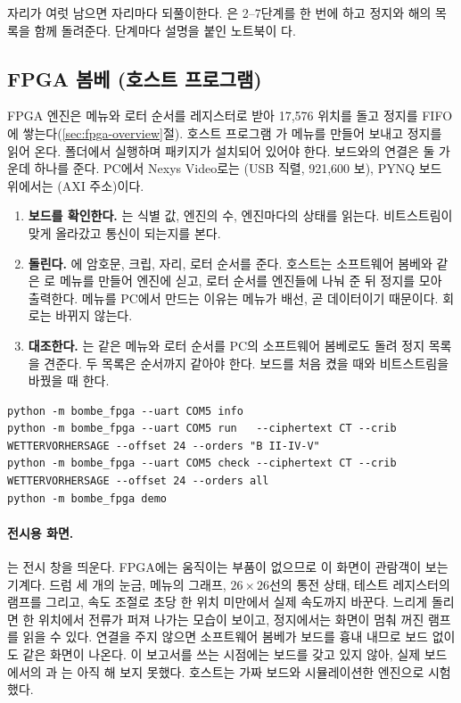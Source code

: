 자리가 여럿 남으면 자리마다 되풀이한다. 은 2--7단계를 한 번에 하고 정지와
해의 목록을 함께 돌려준다. 단계마다 설명을 붙인 노트북이 다.

\subsection{FPGA 봄베 (호스트 프로그램)}

FPGA 엔진은 메뉴와 로터 순서를 레지스터로 받아 17,576 위치를 돌고 정지를 FIFO에 쌓는다(\ref{sec:fpga-overview}절).
호스트 프로그램 가 메뉴를 만들어 보내고 정지를 읽어 온다.  폴더에서
실행하며  패키지가 설치되어 있어야 한다. 보드와의 연결은 둘 가운데 하나를 준다. PC에서 Nexys
Video로는 (USB 직렬, 921,600 보), PYNQ 보드 위에서는 (AXI 주소)이다.

\begin{enumerate}
\item \textbf{보드를 확인한다.} 는 식별 값, 엔진의 수, 엔진마다의 상태를 읽는다. 비트스트림이 맞게
올라갔고 통신이 되는지를 본다.
\item \textbf{돌린다.} 에 암호문, 크립, 자리, 로터 순서를 준다. 호스트는 소프트웨어 봄베와 같은
로 메뉴를 만들어 엔진에 싣고, 로터 순서를 엔진들에 나눠 준 뒤 정지를
모아 출력한다. 메뉴를 PC에서 만드는 이유는 메뉴가 배선, 곧 데이터이기 때문이다. 회로는 바뀌지 않는다.
\item \textbf{대조한다.} 는 같은 메뉴와 로터 순서를 PC의 소프트웨어 봄베로도 돌려 정지 목록을
견준다. 두 목록은 순서까지 같아야 한다. 보드를 처음 켰을 때와 비트스트림을 바꿨을 때 한다.
\end{enumerate}

\begin{lstlisting}[numbers=none]
python -m bombe_fpga --uart COM5 info
python -m bombe_fpga --uart COM5 run   --ciphertext CT --crib WETTERVORHERSAGE --offset 24 --orders "B II-IV-V"
python -m bombe_fpga --uart COM5 check --ciphertext CT --crib WETTERVORHERSAGE --offset 24 --orders all
python -m bombe_fpga demo
\end{lstlisting}

\paragraph{전시용 화면.} 는 전시 창을 띄운다. FPGA에는 움직이는 부품이 없으므로 이 화면이 관람객이
보는 기계다. 드럼 세 개의 눈금, 메뉴의 그래프, $26 \times 26$선의 통전 상태, 테스트 레지스터의 램프를 그리고,
속도 조절로 초당 한 위치 미만에서 실제 속도까지 바꾼다. 느리게 돌리면 한 위치에서 전류가 퍼져 나가는 모습이
보이고, 정지에서는 화면이 멈춰 꺼진 램프를 읽을 수 있다. 연결을 주지 않으면 소프트웨어 봄베가 보드를 흉내
내므로 보드 없이도 같은 화면이 나온다. 이 보고서를 쓰는 시점에는 보드를 갖고 있지 않아, 실제 보드에서의
과 는 아직 해 보지 못했다. 호스트는 가짜 보드와 시뮬레이션한 엔진으로 시험했다.

